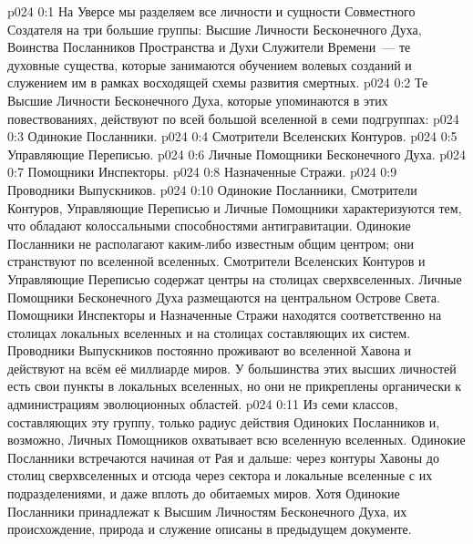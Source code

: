 \author{Божественный Советник}
\vs p024 0:1 На Уверсе мы разделяем все личности и сущности Совместного Создателя на три большие группы: Высшие Личности Бесконечного Духа, Воинства Посланников Пространства и Духи Служители Времени~--- те духовные существа, которые занимаются обучением волевых созданий и служением им в рамках восходящей схемы развития смертных.
\vs p024 0:2 \pc Те Высшие Личности Бесконечного Духа, которые упоминаются в этих повествованиях, действуют по всей большой вселенной в семи подгруппах:
\vs p024 0:3 Одинокие Посланники.
\vs p024 0:4 Смотрители Вселенских Контуров.
\vs p024 0:5 Управляющие Переписью.
\vs p024 0:6 Личные Помощники Бесконечного Духа.
\vs p024 0:7 Помощники Инспекторы.
\vs p024 0:8 Назначенные Стражи.
\vs p024 0:9 Проводники Выпускников.
\vs p024 0:10 \pc Одинокие Посланники, Смотрители Контуров, Управляющие Переписью и Личные Помощники характеризуются тем, что обладают колоссальными способностями антигравитации. Одинокие Посланники не располагают каким\hyp{}либо известным общим центром; они странствуют по вселенной вселенных. Смотрители Вселенских Контуров и Управляющие Переписью содержат центры на столицах сверхвселенных. Личные Помощники Бесконечного Духа размещаются на центральном Острове Света. Помощники Инспекторы и Назначенные Стражи находятся соответственно на столицах локальных вселенных и на столицах составляющих их систем. Проводники Выпускников постоянно проживают во вселенной Хавона и действуют на всём её миллиарде миров. У большинства этих высших личностей есть свои пункты в локальных вселенных, но они не прикреплены органически к администрациям эволюционных областей.
\vs p024 0:11 Из семи классов, составляющих эту группу, только радиус действия Одиноких Посланников и, возможно, Личных Помощников охватывает всю вселенную вселенных. Одинокие Посланники встречаются начиная от Рая и дальше: через контуры Хавоны до столиц сверхвселенных и отсюда через сектора и локальные вселенные с их подразделениями, и даже вплоть до обитаемых миров. Хотя Одинокие Посланники принадлежат к Высшим Личностям Бесконечного Духа, их происхождение, природа и служение описаны в предыдущем документе.
